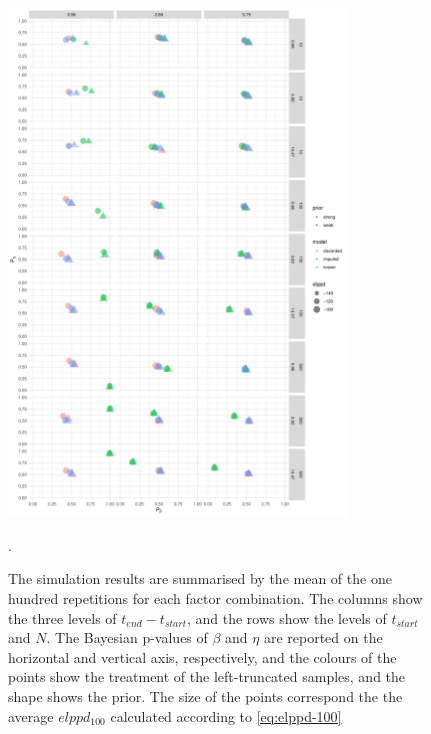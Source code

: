 \begin{figure}
    \centering
    \includegraphics[width=0.8\textwidth]{./figures/ch-2/sim-results-pvalues.pdf}
    \caption{The simulation results are summarised by the mean of the one hundred repetitions for each factor combination. The columns show the three levels of $t_{end} - t_{start}$, and the rows show the levels of $t_{start}$ and $N$. The Bayesian p-values of $\beta$ and $\eta$ are reported on the horizontal and vertical axis, respectively, and the colours of the points show the treatment of the left-truncated samples, and the shape shows the prior. The size of the points correspond the the average $elppd_{100}$ calculated according to \eqref{eq:elppd-100}}.
    \label{fig:sim-study-pvalue}
\end{figure}

